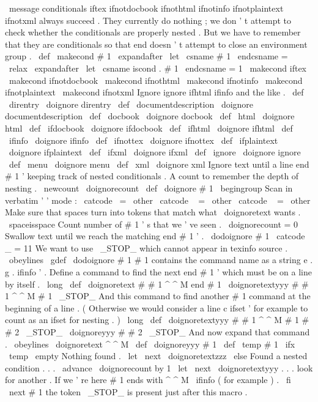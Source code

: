 \
message
{
conditionals
}
%
iftex
ifnotdocbook
ifnothtml
ifnotinfo
ifnotplaintext
%
ifnotxml
always
succeed
.
They
currently
do
nothing
;
we
don
'
t
%
attempt
to
check
whether
the
conditionals
are
properly
nested
.
But
we
%
have
to
remember
that
they
are
conditionals
so
that
end
doesn
'
t
%
attempt
to
close
an
environment
group
.
%
\
def
\
makecond
#
1
{
%
\
expandafter
\
let
\
csname
#
1
\
endcsname
=
\
relax
\
expandafter
\
let
\
csname
iscond
.
#
1
\
endcsname
=
1
}
\
makecond
{
iftex
}
\
makecond
{
ifnotdocbook
}
\
makecond
{
ifnothtml
}
\
makecond
{
ifnotinfo
}
\
makecond
{
ifnotplaintext
}
\
makecond
{
ifnotxml
}
%
Ignore
ignore
ifhtml
ifinfo
and
the
like
.
%
\
def
\
direntry
{
\
doignore
{
direntry
}
}
\
def
\
documentdescription
{
\
doignore
{
documentdescription
}
}
\
def
\
docbook
{
\
doignore
{
docbook
}
}
\
def
\
html
{
\
doignore
{
html
}
}
\
def
\
ifdocbook
{
\
doignore
{
ifdocbook
}
}
\
def
\
ifhtml
{
\
doignore
{
ifhtml
}
}
\
def
\
ifinfo
{
\
doignore
{
ifinfo
}
}
\
def
\
ifnottex
{
\
doignore
{
ifnottex
}
}
\
def
\
ifplaintext
{
\
doignore
{
ifplaintext
}
}
\
def
\
ifxml
{
\
doignore
{
ifxml
}
}
\
def
\
ignore
{
\
doignore
{
ignore
}
}
\
def
\
menu
{
\
doignore
{
menu
}
}
\
def
\
xml
{
\
doignore
{
xml
}
}
%
Ignore
text
until
a
line
end
#
1
'
keeping
track
of
nested
conditionals
.
%
%
A
count
to
remember
the
depth
of
nesting
.
\
newcount
\
doignorecount
\
def
\
doignore
#
1
{
\
begingroup
%
Scan
in
verbatim
'
'
mode
:
\
catcode
\
=
\
other
\
catcode
\
{
=
\
other
\
catcode
\
}
=
\
other
%
%
Make
sure
that
spaces
turn
into
tokens
that
match
what
\
doignoretext
wants
.
\
spaceisspace
%
%
Count
number
of
#
1
'
s
that
we
'
ve
seen
.
\
doignorecount
=
0
%
%
Swallow
text
until
we
reach
the
matching
end
#
1
'
.
\
dodoignore
{
#
1
}
%
}
{
\
catcode
_
=
11
%
We
want
to
use
\
_STOP_
which
cannot
appear
in
texinfo
source
.
\
obeylines
%
%
\
gdef
\
dodoignore
#
1
{
%
%
#
1
contains
the
command
name
as
a
string
e
.
g
.
ifinfo
'
.
%
%
Define
a
command
to
find
the
next
end
#
1
'
which
must
be
on
a
line
%
by
itself
.
\
long
\
def
\
doignoretext
#
#
1
^
^
M
end
#
1
{
\
doignoretextyyy
#
#
1
^
^
M
#
1
\
_STOP_
}
%
%
And
this
command
to
find
another
#
1
command
at
the
beginning
of
a
%
line
.
(
Otherwise
we
would
consider
a
line
c
ifset
'
for
%
example
to
count
as
an
ifset
for
nesting
.
)
\
long
\
def
\
doignoretextyyy
#
#
1
^
^
M
#
1
#
#
2
\
_STOP_
{
\
doignoreyyy
{
#
#
2
}
\
_STOP_
}
%
%
%
And
now
expand
that
command
.
\
obeylines
%
\
doignoretext
^
^
M
%
}
%
}
\
def
\
doignoreyyy
#
1
{
%
\
def
\
temp
{
#
1
}
%
\
ifx
\
temp
\
empty
%
Nothing
found
.
\
let
\
next
\
doignoretextzzz
\
else
%
Found
a
nested
condition
.
.
.
\
advance
\
doignorecount
by
1
\
let
\
next
\
doignoretextyyy
%
.
.
.
look
for
another
.
%
If
we
'
re
here
#
1
ends
with
^
^
M
\
ifinfo
(
for
example
)
.
\
fi
\
next
#
1
%
the
token
\
_STOP_
is
present
just
after
this
macro
.
}
